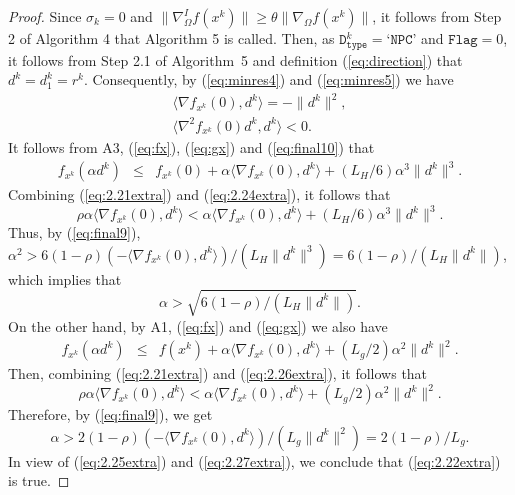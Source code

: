 \documentclass[11pt]{article}
\begin{document}
\begin{proof}
Since $\sigma_{k}=0$ and $\|\nabla_{\Omega}^{I}f(x^{k})\|\geq\theta\|\nabla_{\Omega}f(x^{k})\|$, it follows from Step 2 of Algorithm 4 that Algorithm 5 is called. Then, as $\texttt{D}_{\texttt{type}}^{k}=\texttt{`NPC'}$ and $\texttt{Flag}=0$, it follows from Step 2.1 of Algorithm~5 and definition (\ref{eq:direction}) that $d^{k}=d_{1}^{k}=r^{k}$. Consequently, by (\ref{eq:minres4}) and (\ref{eq:minres5}) we have
\begin{eqnarray} 
&\langle\nabla f_{x^{k}}(0),d^{k}\rangle = -\|d^{k}\|^{2},& \label{eq:final9} \\
&\langle\nabla^{2}f_{x^{k}}(0)d^{k},d^{k}\rangle < 0.& \label{eq:final10}
\end{eqnarray}
It follows from A3, (\ref{eq:fx}), (\ref{eq:gx}) and (\ref{eq:final10}) that
\small
\begin{eqnarray}
    f_{x^{k}}(\alpha d^{k})&\leq& 
    f_{x^{k}}(0)+\alpha\langle\nabla f_{x^{k}}(0),d^{k}\rangle+(L_{H}/6)\alpha^{3}\|d^{k}\|^{3}.
    \label{eq:2.24extra}
\end{eqnarray}
\normalsize
Combining (\ref{eq:2.21extra}) and (\ref{eq:2.24extra}), it follows that
\[
\rho\alpha\langle\nabla f_{x^{k}}(0),d^{k}\rangle<\alpha\langle\nabla f_{x^{k}}(0),d^{k}\rangle+(L_{H}/6)\alpha^{3}\|d^{k}\|^{3}.
\]
Thus, by (\ref{eq:final9}),
$\alpha^{2}>6(1-\rho)\left(-\langle\nabla f_{x^{k}}(0),d^{k}\rangle\right) / (L_{H}\|d^{k}\|^{3}) = 6(1-\rho)/(L_{H}\|d^{k}\|)$,
which implies that 
\small
\begin{equation}
\alpha>\sqrt{6(1-\rho) / (L_{H}\|d^{k}\|)}.
\label{eq:2.25extra}
\end{equation}
\normalsize
On the other hand, by A1, (\ref{eq:fx}) and (\ref{eq:gx}) we also have
\begin{eqnarray}
f_{x^{k}}(\alpha d^{k})&\leq& 
f(x^{k})+\alpha\langle\nabla f_{x^{k}}(0),d^{k}\rangle+(L_{g}/2)\alpha^{2}\|d^{k}\|^{2}.
\label{eq:2.26extra}
\end{eqnarray}
Then, combining (\ref{eq:2.21extra}) and (\ref{eq:2.26extra}), it follows that
\[
\rho\alpha\langle\nabla f_{x^{k}}(0),d^{k}\rangle<\alpha\langle\nabla f_{x^{k}}(0),d^{k}\rangle+(L_{g}/2)\alpha^{2}\|d^{k}\|^{2}.
\]
Therefore, by (\ref{eq:final9}), we get 
\begin{equation}
\alpha>2(1-\rho)(-\langle\nabla f_{x^{k}}(0),d^{k}\rangle) / (L_{g}\|d^{k}\|^{2}) = 2(1-\rho) / L_{g}.
\label{eq:2.27extra}
\end{equation}
In view of (\ref{eq:2.25extra}) and (\ref{eq:2.27extra}), we conclude that (\ref{eq:2.22extra}) is true.
\end{proof}
\end{document}
